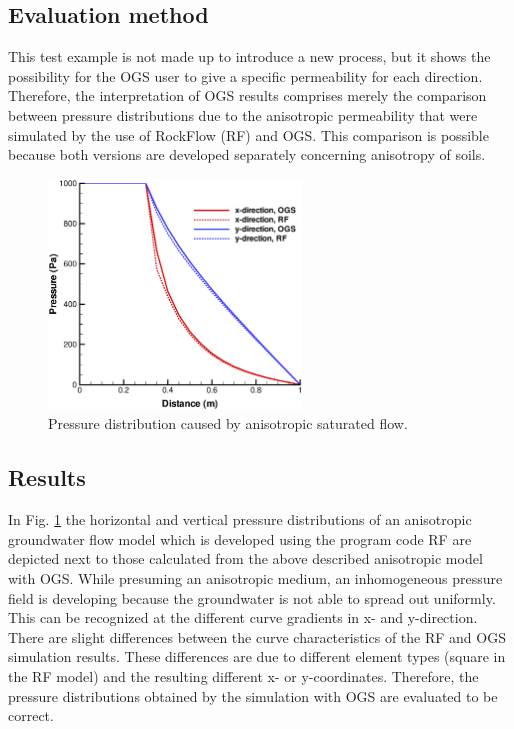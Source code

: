 \subsection{Evaluation method}
This test example is not made up to introduce a new process, but it shows the possibility for the OGS user to give a specific permeability for each direction. Therefore, the interpretation of OGS results comprises merely the comparison between pressure distributions due to the anisotropic permeability that were simulated by the use of RockFlow (RF) and OGS. This comparison is possible because both versions are developed separately concerning anisotropy of soils.

\begin{figure}[h!]
\centering
\includegraphics[width=0.6\textwidth]{Chapter5/figure/anisotropicresult.eps}
\caption{Pressure distribution caused by anisotropic saturated flow.}
\label{GW:anisotropicresult}
\end{figure}

\subsection{Results}

In Fig. \ref{GW:anisotropicresult} the horizontal and vertical pressure distributions of an anisotropic groundwater flow model which is developed using the program code RF are depicted next to those calculated from the above described anisotropic model with OGS. While presuming an anisotropic medium, an inhomogeneous pressure field is developing because the groundwater is not able to spread out uniformly. This can be recognized at the different curve gradients in x- and y-direction. There are slight differences between the curve characteristics of the RF and OGS simulation results. These differences are due to different element types (square in the RF model) and the resulting different x- or y-coordinates. Therefore, the pressure distributions obtained by the simulation with OGS are evaluated to be correct.